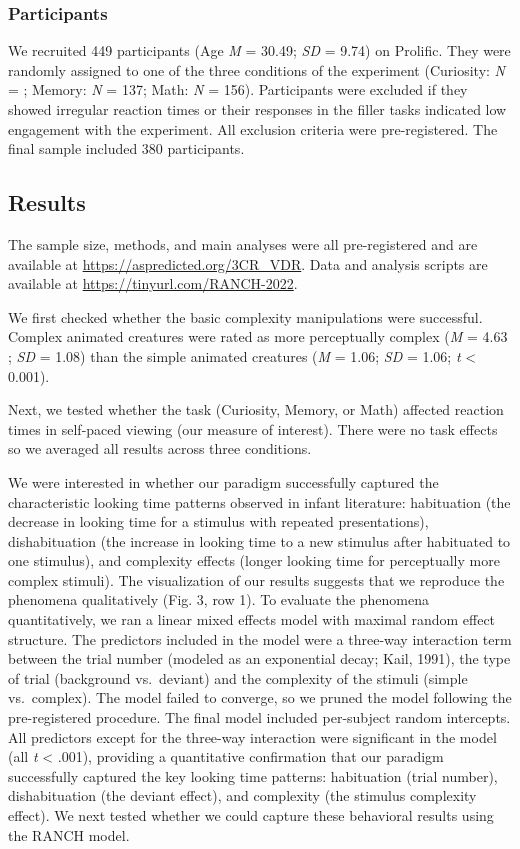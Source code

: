 \documentclass[10pt, letterpaper]{article}
\begin{document}
\hypertarget{participants}{%
\subsubsection{Participants}\label{participants}}

We recruited 449 participants (Age \emph{M} = 30.49; \emph{SD} = 9.74)
on Prolific. They were randomly assigned to one of the three conditions
of the experiment (Curiosity: \emph{N} = ; Memory: \emph{N} = 137; Math:
\emph{N} = 156). Participants were excluded if they showed irregular
reaction times or their responses in the filler tasks indicated low
engagement with the experiment. All exclusion criteria were
pre-registered. The final sample included 380 participants.

\hypertarget{results}{%
\subsection{Results}\label{results}}

The sample size, methods, and main analyses were all pre-registered and
are available at \url{https://aspredicted.org/3CR_VDR}. Data and
analysis scripts are available at \url{https://tinyurl.com/RANCH-2022}.

We first checked whether the basic complexity manipulations were
successful. Complex animated creatures were rated as more perceptually
complex (\emph{M} = 4.63 ; \emph{SD} = 1.08) than the simple animated
creatures (\emph{M} = 1.06; \emph{SD} = 1.06; \emph{t} \textless{}
0.001).

Next, we tested whether the task (Curiosity, Memory, or Math) affected
reaction times in self-paced viewing (our measure of interest). There
were no task effects so we averaged all results across three conditions.

We were interested in whether our paradigm successfully captured the
characteristic looking time patterns observed in infant literature:
habituation (the decrease in looking time for a stimulus with repeated
presentations), dishabituation (the increase in looking time to a new
stimulus after habituated to one stimulus), and complexity effects
(longer looking time for perceptually more complex stimuli). The
visualization of our results suggests that we reproduce the phenomena
qualitatively (Fig. 3, row 1). To evaluate the phenomena quantitatively,
we ran a linear mixed effects model with maximal random effect
structure. The predictors included in the model were a three-way
interaction term between the trial number (modeled as an exponential
decay; Kail, 1991), the type of trial (background vs.~deviant) and the
complexity of the stimuli (simple vs.~complex). The model failed to
converge, so we pruned the model following the pre-registered procedure.
The final model included per-subject random intercepts. All predictors
except for the three-way interaction were significant in the model (all
\emph{t} \textless{} .001), providing a quantitative confirmation that
our paradigm successfully captured the key looking time patterns:
habituation (trial number), dishabituation (the deviant effect), and
complexity (the stimulus complexity effect). We next tested whether we
could capture these behavioral results using the RANCH model.
\end{document}
